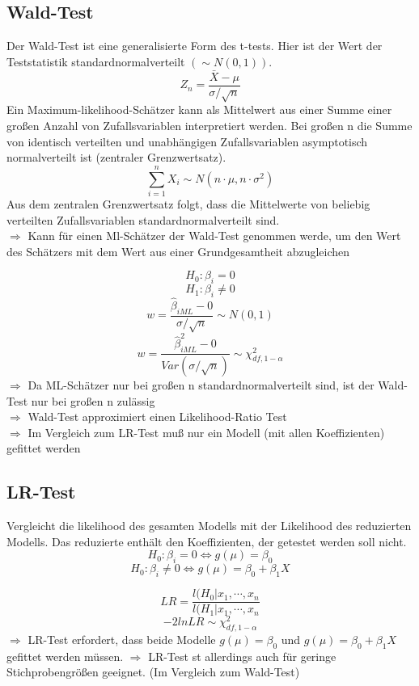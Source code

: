 \subsection{Wald-Test}
Der Wald-Test ist eine generalisierte Form des t-tests. Hier ist der Wert der Teststatistik standardnormalverteilt $(\sim N(0,1))$.
\[Z_n = \frac{\bar{X} - \mu}{\sigma / \sqrt{n}} \]
Ein Maximum-likelihood-Schätzer kann als Mittelwert aus einer Summe einer großen Anzahl von Zufallsvariablen interpretiert werden.
Bei großen n die Summe von identisch verteilten und unabhängigen Zufallsvariablen asymptotisch normalverteilt ist (zentraler Grenzwertsatz).
\[\sum\limits_{i=1}^{n} X_i \sim N(n \cdot \mu, n \cdot \sigma^{2}) \]
Aus dem zentralen Grenzwertsatz folgt, dass die Mittelwerte von beliebig verteilten Zufallsvariablen standardnormalverteilt sind. \\
$\Rightarrow$ Kann für einen Ml-Schätzer der Wald-Test genommen werde, um den Wert des Schätzers mit dem Wert aus einer Grundgesamtheit abzugleichen

\[ H_0: \beta_i = 0 \]
\[ H_1: \beta_i \neq 0 \]
\[ w = \frac{\hat{\beta}_{iML}-0}{\sigma / \sqrt{n}} \sim N(0,1) \]
\[ w = \frac{\hat{\beta}_{iML}^{2}-0}{Var(\sigma / \sqrt{n})} \sim \chi_{df,1-\alpha}^{2} \]
$\Rightarrow$ Da ML-Schätzer nur bei großen n standardnormalverteilt sind, ist der Wald-Test nur bei großen n zulässig \\
$\Rightarrow$ Wald-Test approximiert einen Likelihood-Ratio Test \\
$\Rightarrow$ Im Vergleich zum LR-Test muß nur ein Modell (mit allen Koeffizienten) gefittet werden \\
\subsection{LR-Test}
Vergleicht die likelihood des gesamten Modells mit der Likelihood des reduzierten Modells. Das reduzierte enthält den Koeffizienten, der getestet werden soll nicht.
\[ H_0 : \beta_i = 0 \Leftrightarrow g(\mu) = \beta_0 \]
\[ H_0 : \beta_i \neq 0 \Leftrightarrow g(\mu) = \beta_0 + \beta_1 X \]

\[LR = \frac{l(H_0 | x_1,\cdots,x_n}{l(H_1 | x_1,\cdots,x_n}\]
\[ -2 ln LR \sim  \chi_{df,1-\alpha}^{2} \]
$\Rightarrow$ LR-Test erfordert, dass beide Modelle $g(\mu)=\beta_0$ und $g(\mu)=\beta_0 + \beta_1 X$ gefittet werden müssen.
$\Rightarrow$ LR-Test st allerdings auch für geringe Stichprobengrößen geeignet. (Im Vergleich zum Wald-Test)



